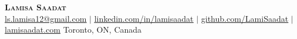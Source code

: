 \documentclass[letterpaper,11pt]{article}
\begin{document}

\begin{center}
    \textbf{\Huge \scshape Lamisa Saadat} \\ \vspace{4pt}
    \href{mailto:ls.lamisa12@gmail.com}{\underline{ls.lamisa12@gmail.com}} $|$ 
    \href{http://www.linkedin.com/in/lamisaadat}{\underline{linkedin.com/in/lamisaadat}} $|$
    \href{https://github.com/LamiSaadat}{\underline{github.com/LamiSaadat}} $|$
    \href{http://www.lamisaadat.com}{\underline{lamisaadat.com}}
    \vspace{4pt} 
    \newline\small Toronto, ON, Canada 
\end{center}


\end{document}
